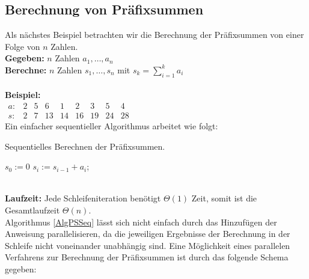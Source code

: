 \subsection{Berechnung von Präfixsummen}
Als nächstes Beispiel betrachten wir die Berechnung der Präfixsummen von einer Folge von $n$ Zahlen. \\
{\bf{Gegeben:}} $n$ Zahlen $a_1,\ldots, a_n$\\
{\bf{Berechne:}} $n$ Zahlen $s_1,\ldots, s_n$ mit $s_k = \sum_{i=1}^{k}{a_i}$\\
\\
{\bf{Beispiel:}}\\
$\begin{matrix}
a: & 2 & 5 & 6 & 1 & 2 & 3 & 5 & 4\\
s: & 2 & 7 & 13 & 14 & 16 & 19 & 24 & 28
\end{matrix}$
\\
Ein einfacher sequentieller Algorithmus arbeitet wie folgt:
\begin{algorithm}
\caption{Sequentielles Berechnen der Präfixsummen.}
\label{AlgPSSeq}
\begin{algorithmic}
\STATE $s_0:=0$
\STATE $s_i:=s_{i-1}+a_i$;
\ENDFOR
\end{algorithmic}
\end{algorithm}
\\
{\bf{Laufzeit:}} Jede Schleifeniteration benötigt $\Theta(1)$ Zeit, somit ist die Gesamtlaufzeit $\Theta(n)$.\\
Algorithmus \ref{AlgPSSeq} lässt sich nicht einfach durch das Hinzufügen der Anweisung \algpar parallelisieren, da die jeweiligen Ergebnisse der  Berechnung in der Schleife nicht voneinander unabhängig sind.
\clearpage
Eine Möglichkeit eines parallelen Verfahrens zur Berechnung der Präfixsummen ist durch das folgende Schema gegeben:\\
